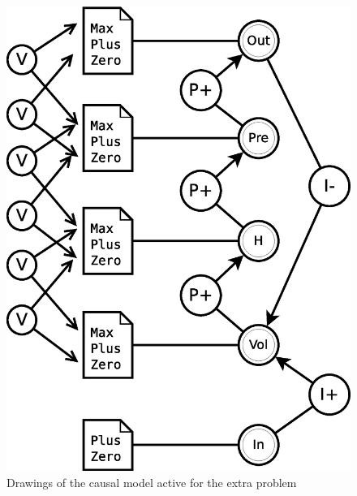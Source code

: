 \documentclass[a4paper]{article}
\begin{document}
\begin{figure}[H]
\centering
\includegraphics[scale=0.5]{problem_extra.eps}
\caption{Drawings of the causal model active for the extra problem}
\end{figure}
\end{document}
